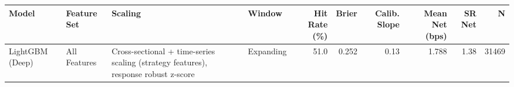 \begin{tabular}{llllrrrrrr}
\toprule
Model & Feature Set & Scaling & Window & Hit Rate (\%) & Brier & Calib. Slope & Mean Net (bps) & SR Net & N \\
\midrule
LightGBM (Deep) & All Features & Cross-sectional + time-series scaling (strategy features), response robust z-score & Expanding & 51.0 & 0.252 & 0.13 & 1.788 & 1.38 & 31469 \\
\bottomrule
\end{tabular}

